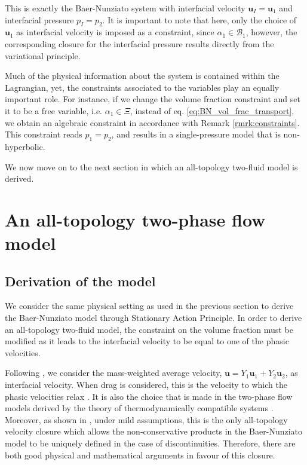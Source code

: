 \documentclass{myclass}
\newcommand{\Xiset}{\Xi}
\newcommand{\Bset}{\mathscr{B}}
\newcommand{\vel}{\bm{u}}
\begin{document}
This is exactly the Baer-Nunziato system \cite{baer:1986} with interfacial velocity $\vel_I=\vel_1$ and interfacial pressure $p_I=p_2$. It is important to note that here, only the choice of $\vel_1$ as interfacial velocity is imposed as a constraint, since $\alpha_1\in\Bset_1$, however, the corresponding closure for the interfacial pressure results directly from the variational principle.

Much of the physical information about the system is contained within the Lagrangian, yet, the constraints associated to the variables play an equally important role. For instance, if we change the volume fraction constraint and set it to be a free variable, i.e. $\alpha_1 \in\Xiset$, instead of eq. \eqref{eq:BN_vol_frac_transport}, we obtain an algebraic constraint in accordance with Remark \ref{rmrk:constraints}. This constraint reads $p_1=p_2$, and results in a single-pressure model that is non-hyperbolic.

We now move on to the next section in which an all-topology two-fluid model is derived.


\section{An all-topology two-phase flow model}\label{sec:Model_derivation}

\subsection{Derivation of the model}

We consider the same physical setting as used in the previous section to derive the Baer-Nunziato model through Stationary Action Principle. In order to derive an all-topology two-fluid model, the constraint on the volume fraction must be modified as it leads to the interfacial velocity to be equal to one of the phasic velocities.

Following \cite{saurel:1999,saurel:2001}, we consider the mass-weighted average velocity, $\vel=Y_1\vel_1+ Y_2\vel_2$, as interfacial velocity. When drag is considered, this is the velocity to which the phasic velocities relax \cite{saurel:1999}. It is also the choice that is made in the two-phase flow models derived by the theory of thermodynamically compatible systems \cite{romenski:2004,romenski:2007,romenski:2010}.  Moreover, as shown in \cite{gallouet:2004}, under mild assumptions, this is the only all-topology velocity closure which allows the non-conservative products in the Baer-Nunziato model to be uniquely defined in the case of discontinuities. Therefore, there are both good physical and mathematical arguments in favour of this closure. 
\end{document}
